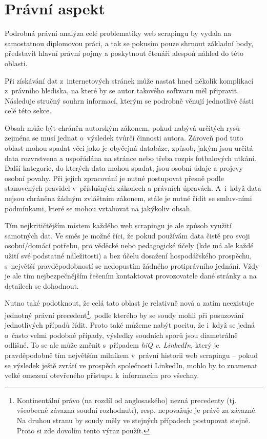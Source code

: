 \documentclass[thesis=B,czech]{FITthesis}[2012/06/26]
\begin{document}

\section{Právní aspekt}
\label{sec:pravni_aspekt}
Podrobná právní analýza celé problematiky web scrapingu by vydala na samostatnou diplomovou práci, a tak se pokusím pouze shrnout základní body, představit hlavní právní pojmy a poskytnout čtenáři alespoň náhled do této oblasti. 

Při získávání dat z~internetových stránek může nastat hned několik komplikací z~právního hlediska, na které by se autor takového softwaru měl připravit. Následuje stručný souhrn informací, kterým se podrobně věnují jednotlivé části celé této sekce.

Obsah může být chráněn autorským zákonem, pokud nabývá určitých rysů -- zejména se musí jednat o~výsledek tvůrčí činnosti autora. Zároveň pod tuto oblast mohou spadat věci jako je obyčejná databáze, způsob, jakým jsou určitá data rozvrstvena a uspořádána na stránce nebo třeba rozpis fotbalových utkání. Další kategorie, do kterých data mohou spadat, jsou osobní údaje a projevy osobní povahy. Při jejich zpracování je nutné postupovat přesně podle stanovených pravidel v~příslušných zákonech a právních úpravách. A~i~když data nejsou chráněna žádným zvláštním zákonem, stále je nutné řídit se smluv-ními podmínkami, které se mohou vztahovat na jakýkoliv obsah.

Tím nejkritičtějším místem každého web scrapingu je ale způsob využití samotných dat. Ve směs je možné říci, že pokud používám data čistě pro svoji osobní/domácí potřebu, pro věděcké nebo pedagogické účely (kde má ale každé užití své podstatné náležitosti) a bez účelu dosažení hospodářského prospěchu, s~největší pravděpodobností se nedopustím žádného protiprávního jednání. Vždy je ale tím nejbezpečnějším řešením kontaktovat provozovatele dané stránky a na detailech se dohodnout.

Nutno také podotknout, že celá tato oblast je relativně nová a zatím neexistuje jednotný právní precedent\footnote{Kontinentální právo (na rozdíl od anglosaského) nezná precedenty (tj. všeobecně závazná soudní rozhodnutí), resp. nepovažuje je právě za závazné. Na druhou stranu by soudy měly ve stejných případech postupovat stejně. Proto si zde dovolím tento výraz použít.}, podle kterého by se soudy mohli při posuzování jednotlivých případů řídit. Proto také můžeme nabýt pocitu, že i~když se jedná o~často velmi podobné případy, výsledky soudních sporů jsou diametrálně odlišné. To se ale může změnit s~případem \emph{hiQ v. LinkedIn}, který je pravděpodobně tím největším milníkem v~právní historii web scrapingu -- pokud se výsledek ještě zvrátí ve prospěch společnosti LinkedIn, mohlo by to znamenat velké omezení otevřeného přístupu k~informacím pro všechny.
\end{document}

